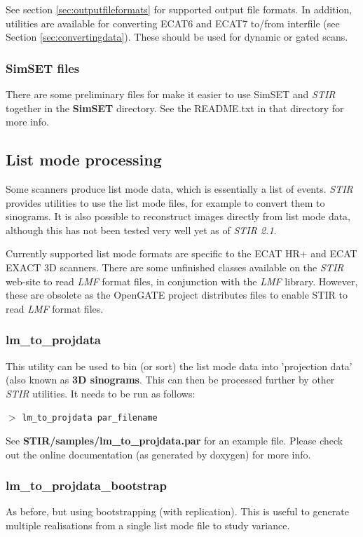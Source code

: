 \documentclass{article}
\newcommand{\cmdline}[1]{\par \noindent $>$ \texttt{#1}\par}
\begin{document}
See section \ref{sec:outputfileformats} for supported output file formats. In addition, 
utilities are available for converting ECAT6 and ECAT7 to/from 
interfile (see Section \ref{sec:convertingdata}). 
These should be used for dynamic 
or gated scans.

\subsubsection{SimSET files}
There are some preliminary files for make it easier to use SimSET and \textit{STIR} together in the
\textbf{SimSET} directory. See the README.txt in that directory for more info.

\subsection{
List mode processing}

Some scanners produce list mode data, which is essentially a 
list of events.  \textit{STIR} provides utilities to use
the list mode files, for example to convert them to sinograms. It is
also possible to reconstruct images directly from list mode data, although
this has not been tested very well yet as of \textit{STIR 2.1}.

Currently supported list mode formats are specific to the ECAT 
HR+ and ECAT EXACT 3D scanners. There are some unfinished classes
available on the \textit{STIR} web-site to read \textit{LMF} format files,
in conjunction with the \textit{LMF} library. However, these are obsolete
as the OpenGATE project distributes files
to enable STIR to read \textit{LMF} format files.

\subsubsection{
lm\_to\_projdata}

This utility can be used to bin (or sort) the list mode data 
into 'projection data' (also known as \textbf{3D sinograms}. 
This can then be processed further by other \textit{STIR} utilities. It 
needs to be run as follows:

\cmdline{lm\_to\_projdata par\_filename}


See \textbf{STIR/samples/lm\_to\_projdata.par} for an example file. Please 
check out the online documentation (as generated by doxygen) 
for more info.

\subsubsection{
lm\_to\_projdata\_bootstrap}
As before, but using bootstrapping (with replication). This is useful to generate multiple realisations 
from a single list mode file to study variance.
\end{document}
